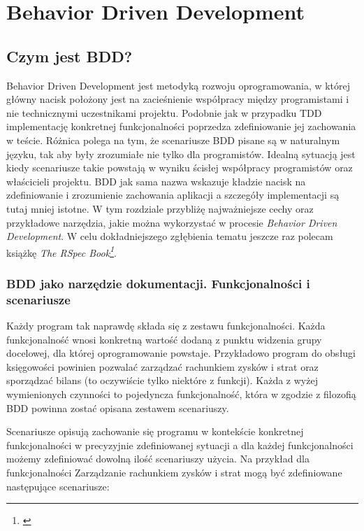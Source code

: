 
\chapter[Behavior Driven Development]{Behavior Driven Development}
  \section{Czym jest BDD?}
    Behavior Driven Development jest metodyką rozwoju oprogramowania, w której główny nacisk położony jest na zacieśnienie współpracy między programistami i nie technicznymi uczestnikami projektu. Podobnie jak w przypadku TDD implementację konkretnej funkcjonalności poprzedza zdefiniowanie jej zachowania w teście. Różnica polega na tym, że scenariusze BDD pisane są w naturalnym języku, tak aby były zrozumiałe nie tylko dla programistów. Idealną sytuacją jest kiedy scenariusze takie powstają w wyniku ścisłej współpracy programistów oraz właścicieli projektu. BDD jak sama nazwa wskazuje kładzie nacisk na zdefiniowanie i zrozumienie zachowania aplikacji a szczegóły implementacji są tutaj mniej istotne. W tym rozdziale przybliżę najważniejsze cechy oraz przykładowe narzędzia, jakie można wykorzystać w procesie \emph{Behavior Driven Development}. W celu dokładniejszego zgłębienia tematu jeszcze raz polecam książkę \emph{The RSpec Book\footnote{\cite{rspec_book}}}.
    
    \subsection{BDD jako narzędzie dokumentacji. Funkcjonalności i scenariusze}
      Każdy program tak naprawdę składa się z zestawu funkcjonalności. Każda funkcjonalność wnosi konkretną wartość dodaną z punktu widzenia grupy docelowej, dla której oprogramowanie powstaje. Przykładowo program do obsługi księgowości powinien pozwalać zarządzać rachunkiem zysków i strat oraz sporządzać bilans (to oczywiście tylko niektóre z funkcji). Każda z wyżej wymienionych czynności to pojedyncza funkcjonalność, która w zgodzie z filozofią BDD powinna zostać opisana zestawem scenariuszy.
      
      Scenariusze opisują zachowanie się programu w kontekście konkretnej funkcjonalności w precyzyjnie zdefiniowanej sytuacji a dla każdej funkcjonalności możemy zdefiniować dowolną ilość scenariuszy użycia. Na przykład dla funkcjonalności Zarządzanie rachunkiem zysków i strat mogą być zdefiniowane następujące scenariusze:
      
